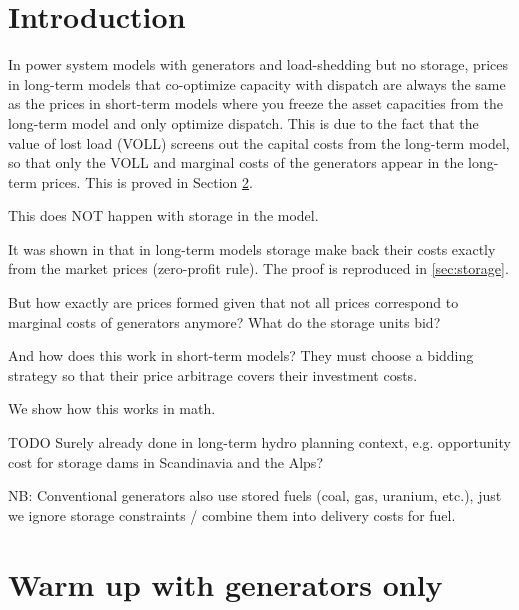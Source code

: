 \documentclass[final,3p,times]{elsarticle}
\begin{document}
\section{Introduction}

In power system models with generators and load-shedding but no
storage, prices in long-term models that co-optimize capacity with
dispatch are always the same as the prices in short-term models where
you freeze the asset capacities from the long-term model and only
optimize dispatch. This is due to the fact that the value of lost load
(VOLL) screens out the capital costs from the long-term model, so that
only the VOLL and marginal costs of the generators appear in the
long-term prices. This is proved in Section \ref{sec:generators}.

This does NOT happen with storage in the model.

It was shown in \cite{Brown2020} that in long-term models storage make
back their costs exactly from the market prices (zero-profit rule). The proof is reproduced in \ref{sec:storage}.

But how exactly are prices formed given that not all prices
correspond to marginal costs of generators anymore? What do the storage units
bid?

And how does this work in short-term models? They must choose a bidding strategy so that their price arbitrage covers their investment costs.

We show how this works in math.

TODO Surely already done in long-term hydro planning context, e.g. opportunity cost for storage dams in Scandinavia and the Alps?

NB: Conventional generators also use stored fuels (coal, gas, uranium, etc.), just we ignore storage constraints / combine them into delivery costs for fuel.

\section{Warm up with generators only}\label{sec:generators}
\end{document}

